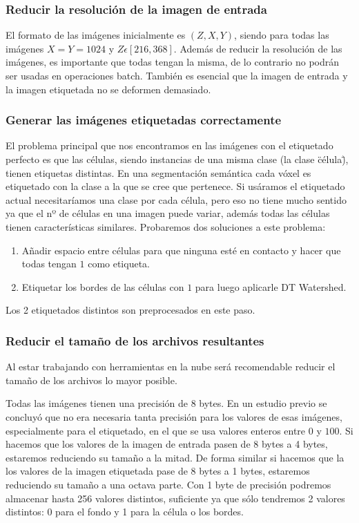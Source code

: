 \subsubsection{Reducir la resolución de la imagen de entrada}

El formato de las imágenes inicialmente es $ (Z,X,Y) $, siendo para todas las imágenes $ X = Y = 1024 $ y $ Z\epsilon[216,368] $. Además de reducir la resolución de las imágenes, es importante que todas tengan la misma, de lo contrario no podrán ser usadas en operaciones batch. También es esencial que la imagen de entrada y la imagen etiquetada no se deformen demasiado.

\subsubsection{Generar las imágenes etiquetadas correctamente}

El problema principal que nos encontramos en las imágenes con el etiquetado perfecto es que las células, siendo instancias de una misma clase (la clase \"célula\"), tienen etiquetas distintas. En una segmentación semántica cada vóxel es etiquetado con la clase a la que se cree que pertenece. Si usáramos el etiquetado actual necesitaríamos una clase por cada célula, pero eso no tiene mucho sentido ya que el nº de células en una imagen puede variar, además todas las células tienen características similares. Probaremos dos soluciones a este problema:

\begin{enumerate}
\item Añadir espacio entre células para que ninguna esté en contacto y hacer que todas tengan $ 1 $ como etiqueta.
\item Etiquetar los bordes de las células con $ 1 $ para luego aplicarle DT Watershed.
\end{enumerate}
Los 2 etiquetados distintos son preprocesados en este paso.

\subsubsection{Reducir el tamaño de los archivos resultantes}

Al estar trabajando con herramientas en la nube será recomendable reducir el tamaño de los archivos lo mayor posible.

Todas las imágenes tienen una precisión de 8 bytes. En un estudio previo se concluyó que no era necesaria tanta precisión para los valores de esas imágenes, especialmente para el etiquetado, en el que se usa valores enteros entre $0$ y $100$. Si hacemos que los valores de la imagen de entrada pasen de 8 bytes a 4 bytes, estaremos reduciendo su tamaño a la mitad. De forma similar si hacemos que la los valores de la imagen etiquetada pase de 8 bytes a 1 bytes, estaremos reduciendo su tamaño a una octava parte. Con 1 byte de precisión podremos almacenar hasta 256 valores distintos, suficiente ya que sólo tendremos 2 valores distintos: 0 para el fondo y 1 para la célula o los bordes. 

